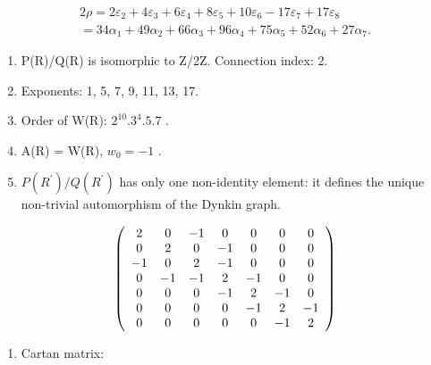 \[
\begin{array}{l} 2 \rho = 2 \varepsilon_ {2} + 4 \varepsilon_ {3} + 6 \varepsilon_ {4} + 8 \varepsilon_ {5} + 10 \varepsilon_ {6} - 17 \varepsilon_ {7} + 17 \varepsilon_ {8} \\ = 34 \alpha_ {1} + 49 \alpha_ {2} + 66 \alpha_ {3} + 96 \alpha_ {4} + 75 \alpha_ {5} + 52 \alpha_ {6} + 27 \alpha_ {7}. \end{array}
\]


\begin{enumerate}
\def\labelenumi{(\Roman{enumi})}
\setcounter{enumi}{7}
\item
  P(R)/Q(R) is isomorphic to Z/2Z. Connection index: 2.
\item
  Exponents: 1, 5, 7, 9, 11, 13, 17.
\item
  Order of W(R): \(2^{10}.3^{4}.5.7\) .
\item
  A(R) = W(R), \(w_{0} = -1\) .
\item
  \(P(R^{\prime})/Q(R^{\prime})\) has only one non-identity element: it defines the unique non-trivial automorphism of the Dynkin graph.
\end{enumerate}

\[
\left( \begin{array}{c c c c c c c} 2 & 0 & - 1 & 0 & 0 & 0 & 0 \\ 0 & 2 & 0 & - 1 & 0 & 0 & 0 \\ - 1 & 0 & 2 & - 1 & 0 & 0 & 0 \\ 0 & - 1 & - 1 & 2 & - 1 & 0 & 0 \\ 0 & 0 & 0 & - 1 & 2 & - 1 & 0 \\ 0 & 0 & 0 & 0 & - 1 & 2 & - 1 \\ 0 & 0 & 0 & 0 & 0 & - 1 & 2 \end{array} \right)
\]

\begin{enumerate}
\def\labelenumi{(\Roman{enumi})}
\setcounter{enumi}{12}
\tightlist
\item
  Cartan matrix:
\end{enumerate}

